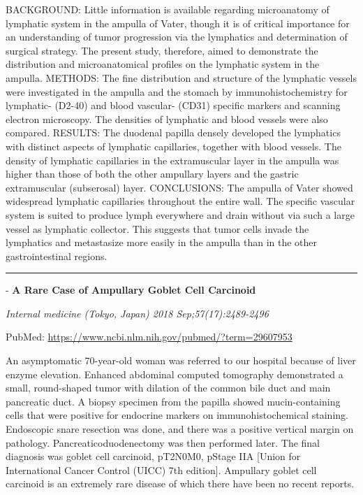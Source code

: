 \documentclass[]{article}
\begin{document}
BACKGROUND: Little information is available regarding microanatomy of
lymphatic system in the ampulla of Vater, though it is of critical
importance for an understanding of tumor progression via the lymphatics
and determination of surgical strategy. The present study, therefore,
aimed to demonstrate the distribution and microanatomical profiles on
the lymphatic system in the ampulla. METHODS: The fine distribution and
structure of the lymphatic vessels were investigated in the ampulla and
the stomach by immunohistochemistry for lymphatic- (D2-40) and blood
vascular- (CD31) specific markers and scanning electron microscopy. The
densities of lymphatic and blood vessels were also compared. RESULTS:
The duodenal papilla densely developed the lymphatics with distinct
aspects of lymphatic capillaries, together with blood vessels. The
density of lymphatic capillaries in the extramuscular layer in the
ampulla was higher than those of both the other ampullary layers and the
gastric extramuscular (subserosal) layer. CONCLUSIONS: The ampulla of
Vater showed widespread lymphatic capillaries throughout the entire
wall. The specific vascular system is suited to produce lymph everywhere
and drain without via such a large vessel as lymphatic collector. This
suggests that tumor cells invade the lymphatics and metastasize more
easily in the ampulla than in the other gastrointestinal regions.

{}

{}

\begin{center}\rule{0.5\linewidth}{\linethickness}\end{center}

 - \textbf{A Rare Case of Ampullary Goblet Cell Carcinoid}

\emph{Internal medicine (Tokyo, Japan) 2018 Sep;57(17):2489-2496}

PubMed: \url{https://www.ncbi.nlm.nih.gov/pubmed/?term=29607953}

An asymptomatic 70-year-old woman was referred to our hospital because
of liver enzyme elevation. Enhanced abdominal computed tomography
demonstrated a small, round-shaped tumor with dilation of the common
bile duct and main pancreatic duct. A biopsy specimen from the papilla
showed mucin-containing cells that were positive for endocrine markers
on immunohistochemical staining. Endoscopic snare resection was done,
and there was a positive vertical margin on pathology.
Pancreaticoduodenectomy was then performed later. The final diagnosis
was goblet cell carcinoid, pT2N0M0, pStage IIA {[}Union for
International Cancer Control (UICC) 7th edition{]}. Ampullary goblet
cell carcinoid is an extremely rare disease of which there have been no
recent reports.
\end{document}
